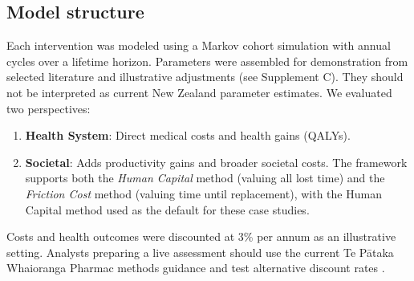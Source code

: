 \documentclass[article]{jss}
\begin{document}
\subsection{Model structure}
Each intervention was modeled using a Markov cohort simulation with annual cycles over a lifetime horizon.
Parameters were assembled for demonstration from selected literature and illustrative adjustments (see Supplement C). They should not be interpreted as current New Zealand parameter estimates.
We evaluated two perspectives:
\begin{enumerate}
    \item \textbf{Health System}: Direct medical costs and health gains (QALYs).
    \item \textbf{Societal}: Adds productivity gains and broader societal costs. The framework supports both the \emph{Human Capital} method (valuing all lost time) and the \emph{Friction Cost} method (valuing time until replacement), with the Human Capital method used as the default for these case studies.
\end{enumerate}
Costs and health outcomes were discounted at 3\% per annum as an illustrative setting. Analysts preparing a live assessment should use the current Te P\={a}taka Whaioranga Pharmac methods guidance and test alternative discount rates \citep{pharmac2020}.
\end{document}
